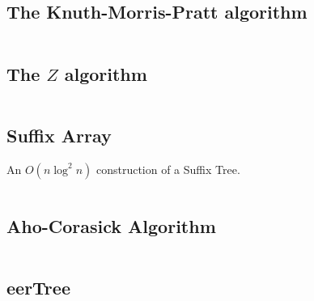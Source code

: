 \documentclass[8pt,a4paper,landscape,oneside]{amsart}
\newcommand{\code}[1]{\inputminted[fontsize=\normalsize,baselinestretch=1]{cpp}{_code/#1}}
\newif\ifverbose
\begin{document}
\begin{multicols*}{3}
    \subsection{The Knuth-Morris-Pratt algorithm}
        \ifverbose
        An implementation of the Knuth-Morris-Pratt algorithm. Runs in $O(n+m)$
        time, where $n$ and $m$ are the lengths of the string and the pattern.
        \fi
        \code{strings/kmp.cpp}

    \subsection{The $Z$ algorithm}
        \ifverbose
        Given a string $S$, $Z_i(S)$ is the longest substring of $S$ starting
        at $i$ that is also a prefix of $S$. The $Z$ algorithm computes these
        $Z$ values in $O(n)$ time, where $n = |S|$. $Z$ values can, for
        example, be used to find all occurrences of a pattern $P$ in a string
        $T$ in linear time. This is accomplished by computing $Z$ values of $S
        = P T$, and looking for all $i$ such that $Z_i \geq |P|$.
        \fi
        \code{strings/z_algorithm.cpp}

    \ifverbose
    \subsection{Trie}
        A Trie class.
        \code{strings/trie.cpp}
    \fi

    \subsection{Suffix Array}
        An $O(n \log^2 n)$ construction of a Suffix Tree.
        \code{strings/suffix_array.cpp}

    \subsection{Aho-Corasick Algorithm}
        \ifverbose
        An implementation of the Aho-Corasick algorithm. Constructs a state
        machine from a set of keywords which can be used to search a string for
        any of the keywords.
        \fi
        \code{strings/aho_corasick.cpp}

    \subsection{eerTree}
        \ifverbose
        Constructs an eerTree in $O(n)$, one character at a time.
        \fi
        \code{strings/eertree.cpp}


\end{multicols*}
\end{document}
